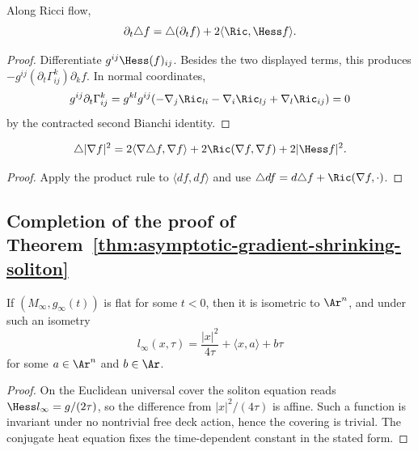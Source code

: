 \begin{claim}\label{claim:laplacian-time-derivative-commutation}
\label{11.20}
Along Ricci flow,
\[
 \partial_t\triangle f=\triangle(\partial_tf)
 +2\langle\Ric,\Hess f\rangle.
\]
\end{claim}
\begin{proof}
\sketch
{}
Differentiate $g^{ij}\Hess(f)_{ij}$. Besides the two displayed
terms, this produces
$-g^{ij}(\partial_t\Gamma^k_{ij})\partial_kf$. In normal
coordinates,
\[
 g^{ij}\partial_t\Gamma^k_{ij}
 =g^{kl}g^{ij}(-\nabla_j\Ric_{li}-\nabla_i\Ric_{lj}
 +\nabla_l\Ric_{ij})=0
\]
by the contracted second Bianchi identity.
\end{proof}

\begin{claim}\label{claim:laplacian-gradient-squared-formula}
\[
 \triangle|\nabla f|^2
 =2\langle\nabla\triangle f,\nabla f\rangle
 +2\Ric(\nabla f,\nabla f)+2|\Hess f|^2.
\]
\end{claim}
\begin{proof}
\sketch
{}
Apply the product rule to $\langle df,df\rangle$ and use
$\triangle df=d\triangle f+\Ric(\nabla f,\cdot)$.
\end{proof}

\subsection{Completion of the proof of
Theorem~{\ref{thm:asymptotic-gradient-shrinking-soliton}}}

\begin{claim}\label{claim:flat-limit-length-function-form}
If $(M_\infty,g_\infty(t))$ is flat for some $t<0$, then it is
isometric to $\Ar^n$, and under such an isometry
\[
 l_\infty(x,\tau)=\frac{|x|^2}{4\tau}+\langle x,a\rangle+b\tau
\]
for some $a\in\Ar^n$ and $b\in\Ar$.
\end{claim}
\begin{proof}
\sketch
{}
On the Euclidean universal cover the soliton equation reads
$\Hess l_\infty=g/(2\tau)$, so the difference from
$|x|^2/(4\tau)$ is affine. Such a function is invariant under no
nontrivial free deck action, hence the covering is trivial. The
conjugate heat equation fixes the time-dependent constant in the
stated form.
\end{proof}

